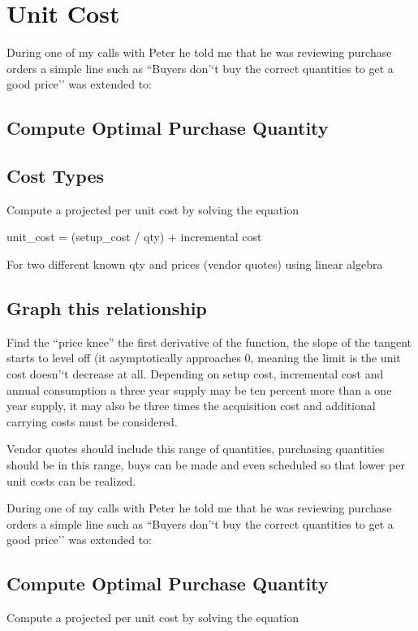 \documentclass[letterpaper,10pt,english]{sphinxmanual}
\begin{document}
\chapter{Unit Cost}
\label{Portal/300-UnitCost::doc}\label{Portal/300-UnitCost:unit-cost}
During one of my calls with Peter he told me that he was reviewing
purchase orders a simple line such as ``Buyers don'`t buy the correct
quantities to get a good price'' was extended to:


\section{Compute Optimal Purchase Quantity}
\label{Portal/300-UnitCost:compute-optimal-purchase-quantity}

\section{Cost Types}
\label{Portal/300-UnitCost:cost-types}
Compute a projected per unit cost by solving the equation

unit\_cost = (setup\_cost / qty) + incremental cost

For two different known qty and prices (vendor quotes) using linear
algebra


\section{Graph this relationship}
\label{Portal/300-UnitCost:graph-this-relationship}
Find the ``price knee'' the first derivative of the function, the slope of
the tangent starts to level off (it asymptotically approaches 0, meaning
the limit is the unit cost doesn'`t decrease at all. Depending on setup
cost, incremental cost and annual consumption a three year supply may be
ten percent more than a one year supply, it may also be three times the
acquisition cost and additional carrying costs must be considered.

Vendor quotes should include this range of quantities, purchasing
quantities should be in this range, buys can be made and even scheduled
so that lower per unit costs can be realized.

During one of my calls with Peter he told me that he was reviewing
purchase orders a simple line such as ``Buyers don'`t buy the correct
quantities to get a good price'' was extended to:


\section{Compute Optimal Purchase Quantity}
\label{Portal/300-UnitCost:id1}
Compute a projected per unit cost by solving the equation
\end{document}
